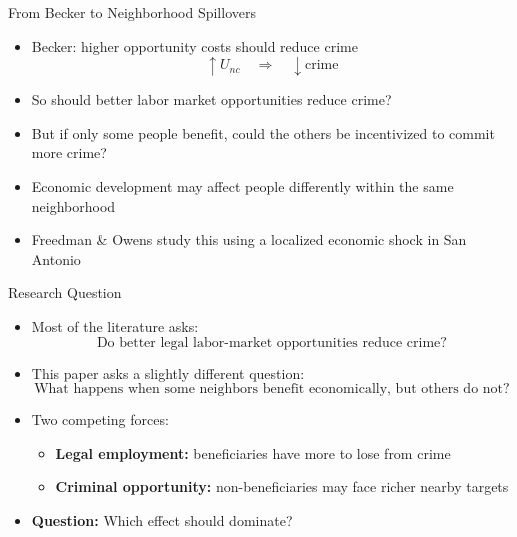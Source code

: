 \documentclass[11pt,notes=hide,aspectratio=169,mathserif]{beamer}
\begin{document}
\begin{frame}{From Becker to Neighborhood Spillovers}
\begin{itemize}
\item Becker: higher opportunity costs should reduce crime
\[
\uparrow U_{nc} \quad \Rightarrow \quad \downarrow \text{crime}
\]
\item So should better labor market opportunities reduce crime?
\pause \item But if only some people benefit, could the others be incentivized to commit more crime?
\pause \item Economic development may affect people differently within the same neighborhood
\pause \item Freedman \& Owens study this using a localized economic shock in San Antonio
\end{itemize}
\end{frame}

\begin{frame}{Research Question}
\begin{itemize}
\item Most of the literature asks:
\[
\text{Do better legal labor-market opportunities reduce crime?}
\]
\pause \item This paper asks a slightly different question:
\[
\text{What happens when some neighbors benefit economically, but others do not?}
\]
\pause \item Two competing forces:
\begin{itemize}
\item \textbf{Legal employment:} beneficiaries have more to lose from crime
\item \textbf{Criminal opportunity:} non-beneficiaries may face richer nearby targets
\end{itemize}
\pause \item \textbf{Question:} Which effect should dominate?
\end{itemize}
\end{frame}
\end{document}
